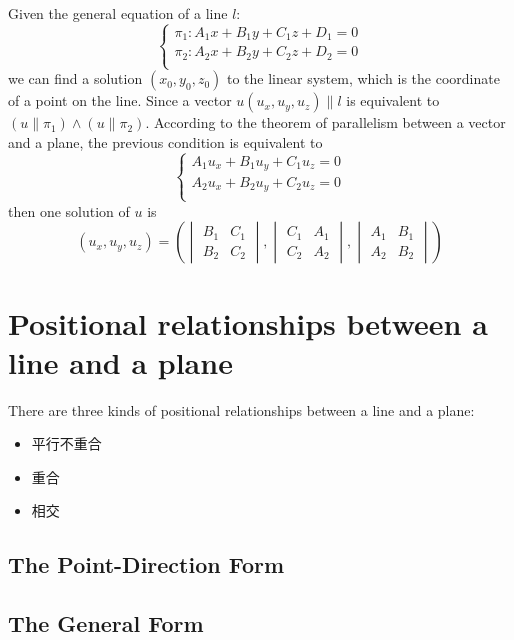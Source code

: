 \documentclass[onecolumn]{ctexart}
\begin{document}
Given the general equation of a line $l$: 
\[
  \begin{cases}
    \pi_1: A_1 x + B_1 y + C_1 z + D_1 = 0 \\
    \pi_2: A_2 x + B_2 y + C_2 z + D_2 = 0 \\
  \end{cases}
\]
we can find a solution $(x_0, y_0, z_0)$ to the linear system, which is the 
coordinate of a point on the line. Since a vector $u(u_x, u_y, u_z) \parallel l$ 
is equivalent to $(u \parallel \pi_1) \wedge (u \parallel \pi_2)$. According to 
the theorem of parallelism between a vector and a plane, the previous condition 
is equivalent to 
\[
  \begin{cases}
    A_1 u_x + B_1 u_y + C_1 u_z = 0 \\
    A_2 u_x + B_2 u_y + C_2 u_z = 0 \\
  \end{cases}
\]
then one solution of $u$ is
\[
  (u_x, u_y, u_z) = 
  \left(
  \begin{vmatrix}
    B_1 & C_1 \\
    B_2 & C_2
  \end{vmatrix},
  \begin{vmatrix}
    C_1 & A_1 \\
    C_2 & A_2
  \end{vmatrix},
  \begin{vmatrix}
    A_1 & B_1 \\
    A_2 & B_2
  \end{vmatrix}
  \right)
\]

\section{Positional relationships between a line and a plane}
There are three kinds of positional relationships between a line and a plane:
\begin{itemize}
  \item 平行不重合
  \item 重合
  \item 相交
\end{itemize}

\subsection{The Point-Direction Form}

\subsection{The General Form}
\end{document}
